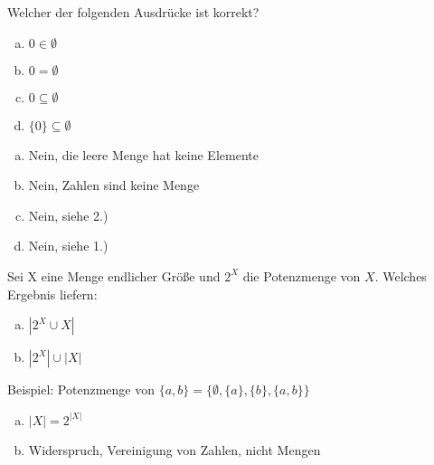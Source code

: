 \begin{card}
	Welcher der folgenden Ausdrücke ist korrekt?
	\begin{enumerate}[a)]
	\item $0 \in \emptyset$
	\item $0 = \emptyset$
	\item $0 \subseteq \emptyset$
	\item $\{0\} \subseteq \emptyset$
	\end{enumerate}
	\hr
	\begin{enumerate}[a)]
	\item Nein, die leere Menge hat keine Elemente
	\item Nein, Zahlen sind keine Menge
	\item Nein, siehe 2.)
	\item Nein, siehe 1.)
	\end{enumerate}
\end{card}

\begin{card}
	Sei X eine Menge endlicher Größe und $2^X$ die Potenzmenge von $X$. Welches Ergebnis liefern:
	\begin{enumerate}[a)]
	\item $|2^X \cup X|$
	\item $|2^X| \cup |X|$
	\end{enumerate}
	\hr
	Beispiel: Potenzmenge  von $\{ a,b \} = \{ \emptyset, \{ a \}, \{ b \} , \{ a,b \} \}$
	\begin{enumerate}[a)]
	\item $|X| = 2^{|X|}$
	\item Widerspruch, Vereinigung von Zahlen, nicht Mengen
	\end{enumerate}
\end{card}